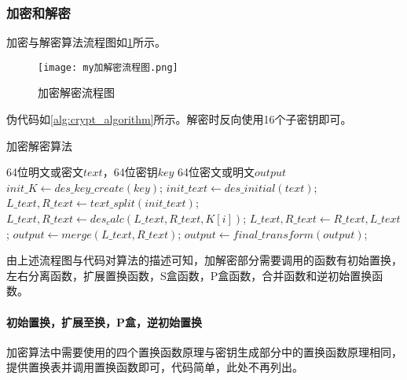 \documentclass[a4paper, zihao=-4, UTF-8]{ctexart}
\begin{document}
            \subsubsection{加密和解密}
                加密与解密算法流程图如\cref{fig:crypt_flow}所示。
                \begin{figure}[htbp]
                    \centering
                    \texttt{[image: my加解密流程图.png]}
                    \caption{加密解密流程图}
                    \label{fig:crypt_flow}
                \end{figure}
            	伪代码如\cref{alg:crypt_algorithm}所示。解密时反向使用16个子密钥即可。
            	\begin{algorithm}[htbp]
            		\caption{加密解密算法}
            		\label{alg:crypt_algorithm}
            		\begin{algorithmic}[1]
            			\Require 64位明文或密文$text$，64位密钥$key$
            			\Ensure 64位密文或明文$output$
            			\State $init\_K\gets des\_key\_create(key)$;
            			\State $init\_text\gets des\_initial(text)$;
            			\State $L\_text,R\_text\gets text\_split(init\_text)$;
            				\State $L\_text, R\_text\gets des_calc(L\_text,R\_text,K[i])$;
            			\EndFor
            			\State $L\_text, R\_text\gets R\_text, L\_text$;
            			\State $output \gets merge(L\_text,R\_text)$;
            			\State $output \gets final\_transform(output)$;
            			\State {}
            			\EndFunction
            		\end{algorithmic}
            	\end{algorithm}
            	\par 由上述流程图与代码对算法的描述可知，加解密部分需要调用的函数有初始置换，左右分离函数，扩展置换函数，S盒函数，P盒函数，合并函数和逆初始置换函数。
            	\paragraph{初始置换，扩展至换，P盒，逆初始置换} 加密算法中需要使用的四个置换函数原理与密钥生成部分中的置换函数原理相同，提供置换表并调用置换函数即可，代码简单，此处不再列出。
\end{document}

